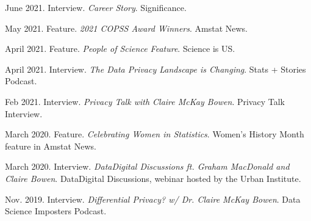\begin{etaremune}[topsep=0pt, itemsep=3pt, partopsep=0pt, parsep=0pt]
    \item June 2021. Interview. \textit{Career Story}. Significance.
    
    \item May 2021. Feature. \textit{2021 COPSS Award Winners}. Amstat News.
    
    \item April 2021. Feature. \textit{People of Science Feature}. Science is US.
    
    \item April 2021. Interview. \textit{The Data Privacy Landscape is Changing}. Stats + Stories Podcast.
    
    \item Feb 2021. Interview. \textit{Privacy Talk with Claire McKay Bowen}. Privacy Talk Interview.

    \item March 2020. Feature. \textit{Celebrating Women in Statistics}. Women's History Month feature in Amstat News.

    \item March 2020. Interview. \textit{Data\@Urban Digital Discussions ft. Graham MacDonald and Claire Bowen}. Data\@Urban Digital Discussions, webinar hosted by the Urban Institute.
    
    \item Nov. 2019. Interview. \textit{Differential Privacy? w/ Dr. Claire McKay Bowen}. Data Science Imposters Podcast.
\end{etaremune}
